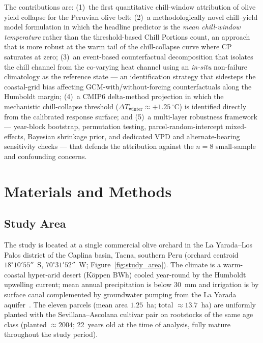 \documentclass[agronomy,article,submit,pdftex,moreauthors]{Definitions/mdpi}
\begin{document}
The contributions are: (1)~the first quantitative chill-window attribution of olive yield collapse for the Peruvian olive belt; (2)~a methodologically novel chill--yield model formulation in which the headline predictor is the \emph{mean chill-window temperature} rather than the threshold-based Chill Portions count, an approach that is more robust at the warm tail of the chill-collapse curve where CP saturates at zero; (3)~an event-based counterfactual decomposition that isolates the chill channel from the co-varying heat channel using an \emph{in-situ} non-failure climatology as the reference state --- an identification strategy that sidesteps the coastal-grid bias affecting GCM-with/without-forcing counterfactuals along the Humboldt margin; (4)~a CMIP6 delta-method projection in which the mechanistic chill-collapse threshold ($\Delta T_{\text{winter}}\approx +1.25\,^\circ$C) is identified directly from the calibrated response surface; and (5)~a multi-layer robustness framework --- year-block bootstrap, permutation testing, parcel-random-intercept mixed-effects, Bayesian shrinkage prior, and dedicated VPD and alternate-bearing sensitivity checks --- that defends the attribution against the $n{=}8$ small-sample and confounding concerns.

\section{Materials and Methods}
\label{sec:materials_methods}

\subsection{Study Area}
\label{sec:study_area}

The study is located at a single commercial olive orchard in the La Yarada--Los Palos district of the Caplina basin, Tacna, southern Peru (orchard centroid $18^\circ10'55''$~S, $70^\circ31'52''$~W; Figure~\ref{fig:study_area}). The climate is a warm-coastal hyper-arid desert (Köppen BWh) cooled year-round by the Humboldt upwelling current; mean annual precipitation is below 30~mm and irrigation is by surface canal complemented by groundwater pumping from the La Yarada aquifer~\cite{chucuya2022,pinovargas2022enso}. The eleven parcels (mean area $1.25$~ha; total $\approx 13.7$~ha) are uniformly planted with the Sevillana--Ascolana cultivar pair on rootstocks of the same age class (planted $\approx 2004$; 22~years old at the time of analysis, fully mature throughout the study period).
\end{document}
